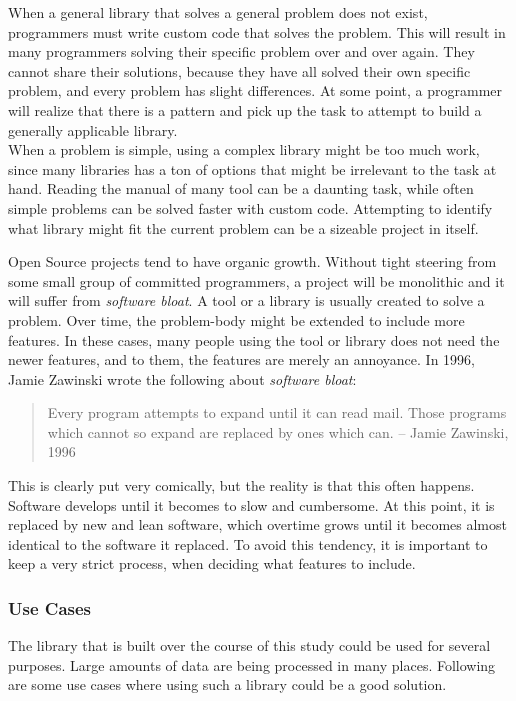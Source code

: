 \documentclass[a4paper]{article}
\begin{document}
When a general library that solves a general problem does not exist, programmers must write custom code that solves the problem. This will result in many programmers solving their specific problem over and over again. They cannot share their solutions, because they have all solved their own specific problem, and every problem has slight differences. At some point, a programmer will realize that there is a pattern and pick up the task to attempt to build a generally applicable library.\\

When a problem is simple, using a complex library might be too much work, since many libraries has a ton of options that might be irrelevant to the task at hand. Reading the manual of many tool can be a daunting task, while often simple problems can be solved faster with custom code. Attempting to identify what library might fit the current problem can be a sizeable project in itself. 

Open Source projects tend to have organic growth. Without tight steering from some small group of committed programmers, a project will be monolithic and it will suffer from \textit{software bloat}. A tool or a library is usually created to solve a problem. Over time, the problem-body might be extended to include more features. In these cases, many people using the tool or library does not need the newer features, and to them, the features are merely an annoyance. In 1996, Jamie Zawinski wrote the following about \textit{software bloat}\cite{bloat}:

\begin{quotation}
  Every program attempts to expand until it can read mail. Those programs which cannot so expand are replaced by ones which can.
  -- Jamie Zawinski, 1996
\end{quotation}

This is clearly put very comically, but the reality is that this often happens. Software develops until it becomes to slow and cumbersome. At this point, it is replaced by new and lean software, which overtime grows until it becomes almost identical to the software it replaced. To avoid this tendency, it is important to keep a very strict process, when deciding what features to include.
    

\subsubsection{Use Cases}
The library that is built over the course of this study could be used for several purposes. Large amounts of data are being processed in many places. Following are some use cases where using such a library could be a good solution.\\
\end{document}
